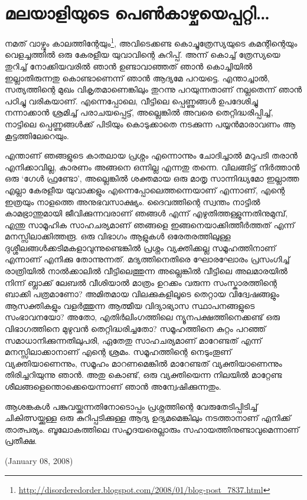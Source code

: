 \section*{മലയാളിയുടെ പെണ്‍കാഴ്ചയെപ്പറ്റി…}
\vskip 2pt

നമത് വാഴ്വും കാലത്തിന്റേയും\footnote{\url{http://disorderedorder.blogspot.com/2008/01/blog-post_7837.html}}, അവിടെക്കണ്ട കൊച്ചുത്രേസ്യയുടെ കമന്റിന്റെയും വെളച്ചത്തില്‍ ഒരു കേരളീയ യുവാവിന്റെ കുറിപ്പ്. അന്ന് കൊച്ച് ത്രേസ്യയെ തുറിച്ച് നോക്കിയവരില്‍ ഞാന്‍ ഉണ്ടാവാഞ്ഞത് ഞാന്‍ കൊച്ചിയില്‍ ഇല്ലാതിരുന്നതു കൊണ്ടാണെന്ന് ഞാന്‍ ആദ്യമേ പറയട്ടെ. എന്താച്ചാല്‍, സത്യത്തിന്റെ മുഖം വികൃതമാണെങ്കിലും തുറന്നു പറയുന്നതാണ് നല്ലതെന്ന് ഞാന്‍ പഠിച്ചു വരികയാണ്. എന്നെപ്പോലെ, വീട്ടിലെ പ്പെണ്ണുങ്ങള്‍ ഉപദേശിച്ചു നന്നാക്കാന്‍ ശ്രമിച്ച് പരാചയപ്പെട്ട്, അല്ലെങ്കില്‍ അവരെ തെറ്റിദ്ധരിപ്പിച്ച്, നാട്ടിലെ പ്പെണ്ണുങ്ങള്‍ക്ക് പിടിയും കൊടുക്കാതെ നടക്കുന്ന പയ്യന്‍മാരാവണം ആ കൂട്ടത്തിലേറെയും.

എന്താണ് ഞങ്ങളുടെ കാതലായ പ്രശ്നം എന്നൊന്നും ചോദിച്ചാല്‍ മറുപടി തരാന്‍ എനിക്കാവില്ല, കാരണം അങ്ങനെ ഒന്നില്ല എന്നതു തന്നെ. വിലങ്ങിട്ട് നിര്‍ത്താന്‍ ഒരു ‘ഗേള്‍ ഫ്രണ്ടോ’, അല്ലെങ്കില്‍ ശക്തമായ ഒരു മാതൃ സാന്നിദ്ധ്യമോ ഇല്ലാത്ത എല്ലാ കേരളീയ യുവാക്കളും എന്നെപ്പോലെത്തന്നെയാണ് എന്നാണ്, എന്റെ ഇത്രയും നാളത്തെ അനുഭവസാക്ഷ്യം. ദൈവത്തിന്റെ സ്വന്തം നാട്ടില്‍ കാമഭ്രാന്തുമായി ജീവിക്കുന്നവരാണ് ഞങ്ങള്‍ എന്ന് എഴുതിത്തള്ളുന്നതിനുമുമ്പ്, എന്തു സാമൂഹിക സാഹചര്യമാണ് ഞങ്ങളെ ഇങ്ങനെയാക്കിത്തീര്‍ത്തത് എന്ന് മനസ്സിലാക്കിത്തരൂ. ഒരു വിഭാഗം ആളുകള്‍ ഒരേതരത്തിലുള്ള ദുശ്ശീലങ്ങള്‍ക്കടിമകളാവുന്നുണ്ടെങ്കില്‍ പ്രശ്നം വ്യക്തിക്കല്ല സമൂഹത്തിനാണ് എന്നാണ് എനിക്കു തോന്നുന്നത്. മദ്യത്തിനെതിരെ ഘോരഘോരം പ്രസംഗിച്ച് രാത്രിയില്‍ നാല്‍ക്കാലില്‍ വീട്ടിലെത്തുന്ന അല്ലെങ്കില്‍ വീട്ടിലെ അലമാരയില്‍ നിന്ന് ബ്ലാക്ക് ലേബല്‍ വീശിയാല്‍ മാത്രം ഉറക്കം വരുന്ന സംസ്കാരത്തിന്റെ ബാക്കി പത്രമാണോ? അമിതമായ വിലക്കുകളിലൂടെ തെറ്റായ വിദ്വേഷങ്ങളും ആസക്തികളും വളര്‍ത്തുന്ന ആത്മീയ വിദ്യാഭ്യാസ സ്ഥാപനങ്ങളുടെ സംഭാവനയോ? അതോ, എതിര്‍ലിംഗത്തിലെ ന്യൂനപക്ഷത്തിനെക്കണ്ട് ഒരു വിഭാഗത്തിനെ മുഴുവന്‍ തെറ്റിദ്ധരിച്ചതോ? സമൂഹത്തിനെ കുറ്റം പറഞ്ഞ് സമാധാനിക്കുന്നതിലുപരി, ഏതേതു സാഹചര്യമാണ് മാറേണ്ടത് എന്ന് മനസ്സിലാക്കാനാണ് എന്റെ ശ്രമം. സമൂഹത്തിന്റെ നെടുംതൂണ് വ്യക്തിയാണെന്നും, സമൂഹം മാറണമെങ്കില്‍ മാറേണ്ടത് വ്യക്തിയാണെന്നും തിരിച്ചറിയുന്നു ഞാന്‍. അതു കൊണ്ട്, ഒരു വ്യക്തിയെന്ന നിലയില്‍ മാറ്റേണ്ട ശീലങ്ങളെന്തൊക്കെയെന്നാണ് ഞാന്‍ അന്വേഷിക്കുന്നതും.

ആശങ്കകള്‍ പങ്കുവയ്ക്കുന്നതിനോടൊപ്പം പ്രശ്നത്തിന്റെ വേരുതേടിപ്പിടിച്ച് ചികിത്സയ്ക്കുള്ള ഒരു കുറിപ്പടിക്കുള്ള ആദ്യ ഉദ്യമമെങ്കിലും നടത്താനാണ് എനിക്ക് താത്പര്യം. ബൂലോകത്തിലെ സഹൃദയരെല്ലാരും സഹായത്തിനുണ്ടാവുമെന്നാണ് പ്രതീക്ഷ.

(January 08, 2008)
\newpage
